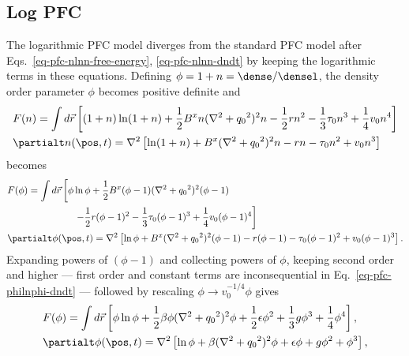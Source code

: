 \subsection{Log PFC}
The logarithmic PFC model diverges from the standard PFC model after Eqs.~\ref{eq-pfc-nlnn-free-energy}, \ref{eq-pfc-nlnn-dndt} by keeping the logarithmic terms in these equations.  Defining $\phi = 1 + n = \dense / \densel$, the density order parameter $\phi$ becomes positive definite and
%
\begin{subequations}
\begin{align}
&F(n) = \int d\vec{r} \left[ (1+n)\ln(1+n) + \frac{1}{2}B^x n (\nabla^2 + {q_0}^2)^2 n - \frac{1}{2} r n^2 - \frac{1}{3} \tau_0 n^3 + \frac{1}{4} v_0 n^4 \right] \\ %
&\partialt n(\pos, t) = \nabla^2 \left[ \ln(1+n) + B^x (\nabla^2 + {q_0}^2)^2 n - r n - \tau_0 n^2 + v_0 n^3 \right] %
\end{align}
\end{subequations}
%
becomes
%
\begin{subequations}
\begin{align}
&F(\phi) = \int d\vec{r} \left[ \phi \ln \phi + \frac{1}{2}B^x (\phi - 1) (\nabla^2 + {q_0}^2)^2 (\phi - 1) \right. \nonumber \\
&\quad\quad\quad\quad\quad\quad\quad \left. - \frac{1}{2} r(\phi - 1)^2 - \frac{1}{3} \tau_0 (\phi - 1)^3 + \frac{1}{4}v_0 (\phi - 1)^4 \right] \label{eq-pfc-philnphi-free-energy} \\
&\partialt \phi(\pos, t) = \nabla^2 \left[ \ln \phi + B^x (\nabla^2 + {q_0}^2)^2 (\phi - 1) - r (\phi - 1) - \tau_0 (\phi - 1)^2 + v_0 (\phi - 1)^3 \right]. \label{eq-pfc-philnphi-dndt}
\end{align}
\end{subequations}
%
Expanding powers of $(\phi - 1)$ and collecting powers of $\phi$, keeping second order and higher --- first order and constant terms are inconsequential in Eq.~\ref{eq-pfc-philnphi-dndt} --- followed by rescaling $\phi \rightarrow v_0^{-1/4} \phi$ gives
%
\begin{subequations}
\begin{align}
& F(\phi) = \int d\vec{r} \left[ \phi \ln \phi +  \frac{1}{2}\beta \phi (\nabla^2 + {q_0}^2)^2 \phi + \frac{1}{2} \epsilon \phi^2 + \frac{1}{3} g \phi^3 + \frac{1}{4} \phi^4 \right], \\
& \partialt \phi(\pos, t) = \nabla^2 \left[ \ln \phi + \beta (\nabla^2 + {q_0}^2)^2 \phi + \epsilon \phi + g \phi^2 + \phi^3 \right],
\end{align}
\end{subequations}
